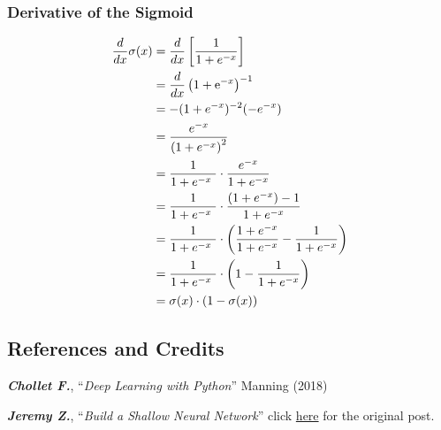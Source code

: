 \documentclass[11pt]{article}
\begin{document}
\hypertarget{derivative-of-the-sigmoid}{%
\subsubsection{Derivative of the
Sigmoid}\label{derivative-of-the-sigmoid}}

\begin{align*}
\dfrac{d}{dx} \sigma(x) &= \dfrac{d}{dx} \left[ \dfrac{1}{1 + e^{-x}} \right] \notag \\
&= \dfrac{d}{dx} \left( 1 + \mathrm{e}^{-x} \right)^{-1} \notag\\
&= -(1 + e^{-x})^{-2}(-e^{-x}) \notag\\
&= \dfrac{e^{-x}}{\left(1 + e^{-x}\right)^2} \notag\\
&= \dfrac{1}{1 + e^{-x}\ } \cdot \dfrac{e^{-x}}{1 + e^{-x}}  \notag\\
&= \dfrac{1}{1 + e^{-x}\ } \cdot \dfrac{(1 + e^{-x}) - 1}{1 + e^{-x}}  \notag\\
&= \dfrac{1}{1 + e^{-x}\ } \cdot \left( \dfrac{1 + e^{-x}}{1 + e^{-x}} - \dfrac{1}{1 + e^{-x}} \right) \notag\\
&= \dfrac{1}{1 + e^{-x}\ } \cdot \left( 1 - \dfrac{1}{1 + e^{-x}} \right) \notag\\
&= \sigma(x) \cdot (1 - \sigma(x))
\end{align*}

    \hypertarget{references-and-credits}{%
\subsection{References and Credits}\label{references-and-credits}}

    \textbf{\emph{Chollet F.}}, ``\emph{Deep Learning with Python}'' Manning
(2018)

    \textbf{\emph{Jeremy Z.}}, ``\emph{Build a Shallow Neural Network}''
click
\href{https://towardsdatascience.com/building-a-shallow-neural-network-a4e2728441e0}{here}
for the original post.


    
    
    
\end{document}
